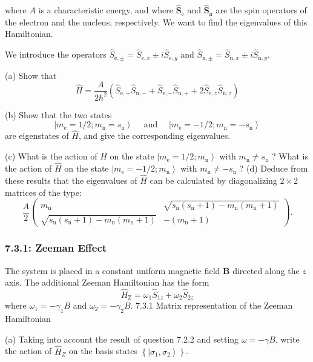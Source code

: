 \documentclass[11pt]{article}
\begin{document}
where \(A\) is a characteristic energy, and where
\(\hat{\boldsymbol{S}}_{\mathrm{e}}\) and \(\hat{\boldsymbol{S}}_{\mathrm{n}}\) are
the spin operators of the electron and the nucleus, respectively. We want to
find the eigenvalues of this Hamiltonian.

We introduce the operators \(\hat{S}_{\mathrm{e}, \pm}=\hat{S}_{\mathrm{e}, x} \pm i
\hat{S}_{\mathrm{e}, y}\) and \(\hat{S}_{\mathrm{n}, \pm}=\hat{S}_{\mathrm{n}, x} \pm
i \hat{S}_{\mathrm{n}, y}\).

(a) Show that $$ \hat{H}=\frac{A}{2 \hbar^2}\left(\hat{S}_{\mathrm{e},+}
\hat{S}_{\mathrm{n},-}+\hat{S}_{\mathrm{e},-} \hat{S}_{\mathrm{n},+}+2
\hat{S}_{\mathrm{e}, z} \hat{S}_{\mathrm{n}, z}\right) $$

(b) Show that the two states $$ \left|m_{\mathrm{e}}=1 / 2 ;
m_{\mathrm{n}}=s_{\mathrm{n}}\right\rangle \quad \text { and } \quad\left|m_{\mathrm{e}}=-1 /
2 ; m_{\mathrm{n}}=-s_{\mathrm{n}}\right\rangle $$ are eigenstates of \(\hat{H}\), and
give the corresponding eigenvalues.

(c) What is the action of \(\hat{H}\) on the state \(\left|m_{\mathrm{e}}=1 / 2 ;
m_{\mathrm{n}}\right\rangle\) with \(m_{\mathrm{n}} \neq s_{\mathrm{n}}\) ? What is the
action of \(\hat{H}\) on the state \(\left|m_{\mathrm{e}}=-1 / 2 ;
m_{\mathrm{n}}\right\rangle\) with \(m_{\mathrm{n}} \neq-s_{\mathrm{n}}\) ? (d) Deduce from
these results that the eigenvalues of \(\hat{H}\) can be calculated by
diagonalizing \(2 \times 2\) matrices of the type: $$
\frac{A}{2}\left(\begin{array}{lr} m_{\mathrm{n}} &
\sqrt{s_{\mathrm{n}}\left(s_{\mathrm{n}}+1\right)-m_{\mathrm{n}}\left(m_{\mathrm{n}}+1\right)}
\\ \sqrt{s_{\mathrm{n}}\left(s_{\mathrm{n}}+1\right)-m_{\mathrm{n}}\left(m_{\mathrm{n}}+1\right)}
& -\left(m_{\mathrm{n}}+1\right) \end{array}\right) . $$
\subsubsection{7.3.1: Zeeman Effect}
\label{sec:org3aacd83}
The system is placed in a constant uniform magnetic field \(\boldsymbol{B}\)
directed along the \(z\) axis. The additional Zeeman Hamiltonian has the form $$
\hat{H}_{\mathrm{Z}}=\omega_1 \hat{S}_{1 z}+\omega_2 \hat{S}_{2 z} $$ where \(\omega_1=-\gamma_1 B\)
and \(\omega_2=-\gamma_2 B\). 7.3.1 Matrix representation of the Zeeman Hamiltonian

(a) Taking into account the result of question 7.2.2 and setting \(\omega=-\gamma B\), write
the action of \(\hat{H}_Z\) on the basis states \(\left\{\left|\sigma_1,
\sigma_2\right\rangle\right\}\).
\end{document}
